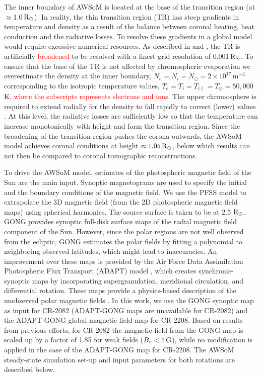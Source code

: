 \documentclass[namedreferences]{solarphysics}
\def\edit#1{\textcolor{Red}{#1}}
\newcommand{\mrsun}{{\rm R_\odot}}
\begin{document}
\begin{article}
The inner boundary of AWSoM is located at the base of the transition region (at $\approx$1.0\,$\mrsun$). In reality, the thin {transition region (TR)} has steep gradients in temperature and density as a result of the balance between coronal heating, heat conduction and the radiative losses. To resolve these gradients in a global model would require excessive numerical resources. As described in \citet{Lio2009} and \citet{Sok2013}{, the TR is artificially \edit{broadened} to be resolved with a} finest grid resolution of 0.001\,$\mrsun$.  To ensure that the base of the TR is not affected by chromospheric evaporation we overestimate the density at the inner boundary, $N_{e}=N_{i}=N_{\odot} =2\times10^{17}$\,m$^{-3}$ corresponding to the isotropic temperature values, $T_{e}=T_{i}=T_{i\parallel}=T_{\odot}=50,000$\,K\edit{, where the subscripts represents electrons and ions}. The upper chromosphere is required to extend radially for the density to fall rapidly to correct (lower) values \citep{Lio2009}.  At this level, the radiative losses are sufficiently low so that the temperature can increase monotonically with height and form the transition region. Since the broadening of the transition region pushes the corona outwards, {the AWSoM model achieves coronal conditions at height $\approx 1.05\,\mrsun$, below which results can not then be compared to coronal tomographic reconstructions.}

To drive {the AWSoM model, estimates} of the photospheric magnetic field of the Sun {are the main} input. Synoptic magnetograms are used to specify the initial and the boundary conditions of the {magnetic field.} We use the PFSS model to extrapolate the 3D magnetic field (from the 2D photospheric magnetic field maps) using spherical harmonics. The source surface is taken to be at 2.5 $\mrsun$. GONG provides synoptic full-disk surface maps of the radial magnetic field component of the Sun. However, since the polar regions are not well observed from the ecliptic, GONG estimates the polar fields by fitting a polynomial to neighboring observed latitudes, which might lead to inaccuracies. An improvement over these maps is provided by the Air Force Data Assimilation Photospheric Flux Transport (ADAPT) model \citep{Wor2000}, which creates synchronic-synoptic maps by incorporating supergranulation, meridional circulation, and differential rotation. These maps provide a physics-based description of the unobserved polar magnetic fields \citep{Arg2010, Hen2012}. In this work, we use the GONG synoptic map as input for CR-2082 (ADAPT-GONG maps are unavailable for CR-2082) and the ADAPT-GONG global magnetic field map for CR-2208. {Based on results from previous efforts, for CR-2082} the magnetic field from the GONG map is scaled up by a factor of 1.85 {for weak fields ($B_r< 5\,\rm{G}$), while no modification is applied in the case of} the ADAPT-GONG map for CR-2208. The AWSoM steady-state simulation set-up and input parameters for both rotations are described below. 


\end{article}
\end{document}
